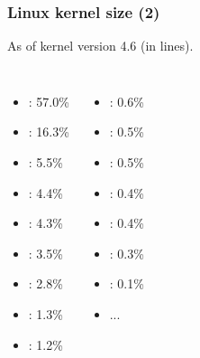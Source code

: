 \begin{frame}
  \frametitle{Linux kernel size (2)}
  As of kernel version 4.6 (in lines).
  \begin{columns}
    \begin{itemize}
    \item {}: 57.0\%
    \item {}: 16.3\%
    \item {}: 5.5\%
    \item {}: 4.4\%
    \item {}: 4.3\%
    \item {}: 3.5\%
    \item {}: 2.8\%
    \item {}: 1.3\%
    \item {}: 1.2\%
    \end{itemize}
    \begin{itemize}
    \item {}: 0.6\%
    \item {}: 0.5\%
    \item {}: 0.5\%
    \item {}: 0.4\%
    \item {}: 0.4\%
    \item {}: 0.3\%
    \item {}: 0.1\%
    \item ...
    \end{itemize}
  \end{columns}
\end{frame}

